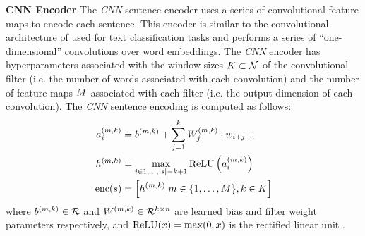 \textbf{CNN Encoder} The \textit{CNN} sentence encoder uses a series of 
convolutional feature maps to encode each sentence. This encoder is similar
to the convolutional architecture of \cite{kim} used for text classification
tasks and performs a series of ``one-dimensional'' convolutions over 
word embeddings. 
The \textit{CNN} encoder has hyperparameters
associated with the window sizes $K \subset \mathcal{N}$ of the convolutional filter 
(i.e. the number of words associated with each convolution) and the number of 
feature maps $M$ associated with each filter
(i.e. the output dimension of each 
convolution). 
The \textit{CNN} sentence encoding is computed as follows:
\begin{align}
 a^{(m,k)}_i &= b^{(m,k)} 
    + \sum^k_{j=1} W^{(m,k)}_j \cdot w_{i + j -1}\\
  h^{(m,k)} &= \max_{i\in 1,\dots, |s| - k + 1} 
                      \operatorname{ReLU}\left(a^{(m,k)}_i\right) \\
 \operatorname{enc}(s) &= \left[h^{(m,k)} | 
   m \in \{1, \ldots, M\},
   k \in K
   \right]
\end{align}
where $b^{(m,k)}\in\mathcal{R}$ and $W^{(m,k)} \in 
\mathcal{R}^{k \times n}$ are learned bias and filter
weight parameters respectively, and $\operatorname{ReLU}(x) = \max(0, x)$ is the rectified
linear unit \cite{relu}.


